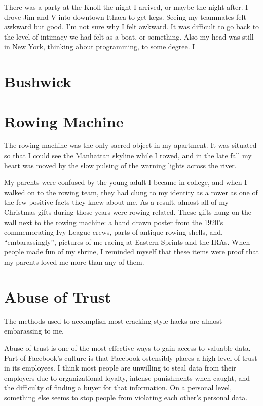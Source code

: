 \documentclass[12pt]{article}
\begin{document}
There was a party at the Knoll the night I arrived, or maybe the night after.  I
drove Jim and V into downtown Ithaca to get kegs.  Seeing my teammates felt
awkward but good.  I'm not sure why I felt awkward.  It was difficult to go back
to the level of intimacy we had felt as a boat, or something.  Also my head was
still in New York, thinking about programming, to some degree.  I  

\section{Bushwick}


\section{Rowing Machine}
The rowing machine was the only sacred object in my apartment.  It was situated
so that I could see the Manhattan skyline while I rowed, and in the late fall
my heart was moved by the slow pulsing of the warning lights across the river.

My parents were confused by the young adult I became in college, and when I
walked on to the rowing team, they had clung to my identity as a rower as one of
the few positive facts they knew about me.  As a result, almost all of my
Christmas gifts during those years were rowing related.  These gifts hung on the
wall next to the rowing machine: a hand drawn poster from the 1920's
commemorating Ivy League crews, parts of antique rowing shells, and,
``embarassingly'', pictures of me racing at Eastern Sprints and the IRAs.  When
people made fun of my shrine, I reminded myself that these items were proof that
my parents loved me more than any of them.


\section{Abuse of Trust}
The methods used to accomplish most cracking-style hacks are almost embarassing
to me. 

Abuse of trust is one of the most effective ways to gain access to valuable
data.  Part of Facebook's culture is that Facebook ostensibly places a high
level of trust in its employees.  I think most people are unwilling to steal
data from their employers due to organizational loyalty, intense punishments
when caught, and the difficulty of finding a buyer for that information.  On a
personal level, something else seems to stop people from violating each other's
personal data.
\end{document}
